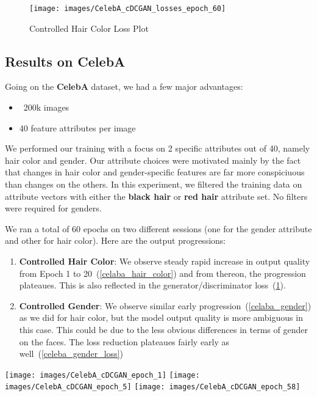 \documentclass[twocolumn,10pt,cleanfoot]{asme2ej}
\begin{document}
\begin{figure}
\centerline{\texttt{[image: images/CelebA\_cDCGAN\_losses\_epoch\_60]}}
\caption{Controlled Hair Color Loss Plot}
\label{celeba_hair_color_loss}
\end{figure}

\subsection{Results on CelebA}
Going on the \textbf{CelebA} dataset, we had a few major advantages:

\begin{itemize}
    \item[-] ~200k images
    \item[-] 40 feature attributes per image
\end{itemize}
We performed our training with a focus on 2 specific attributes out of 40, namely hair color and gender. Our attribute choices were motivated mainly by the fact that changes in hair color and gender-specific features are far more conspiciuous than changes on the others. In this experiment, we filtered the training data on attribute vectors with either the \textbf{black hair} or \textbf{red hair} attribute set. No filters were required for genders.

We ran a total of 60 epochs on two different sessions (one for the gender attribute and other for hair color). Here are the output progressions:

\begin{enumerate}
    \item \textbf{Controlled Hair Color}: We observe steady rapid increase in output quality from Epoch 1 to 20~(\ref{celaba_hair_color}) and from thereon, the progression plateaues. This is also reflected in the generator/discriminator loss~(\ref{celeba_hair_color_loss}).
    \item \textbf{Controlled Gender}: We observe similar early progression~(\ref{celaba_gender}) as we did for hair color, but the model output quality is more ambiguous in this case. This could be due to the less obvious differences in terms of gender on the faces. The loss reduction plateaues fairly early as well~(\ref{celeba_gender_loss})
\end{enumerate}



\begin{figure*}
\texttt{[image: images/CelebA\_cDCGAN\_epoch\_1]}
\texttt{[image: images/CelebA\_cDCGAN\_epoch\_5]}
\texttt{[image: images/CelebA\_cDCGAN\_epoch\_58]}
\caption{Generated 8 Face pairs with black and brown hair specified. Pairs are vertically aligned with top image having brown hair color}
\label{celaba_hair_color}
\end{figure*}
\end{document}
